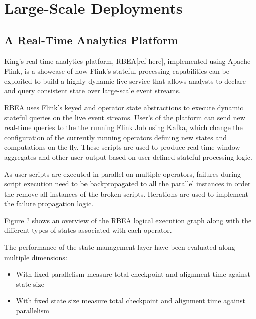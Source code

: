 
\section{Large-Scale Deployments}
\label{sec:evaluation}

\subsection{A Real-Time Analytics Platform}

King's real-time analytics platform, RBEA[ref here], implemented using Apache Flink, is a showcase of how Flink's stateful processing capabilities can be exploited to build a highly dynamic live service that allows analysts to declare and query consistent state over large-scale event streams. 

RBEA uses Flink's keyed and operator state abstractions to execute dynamic stateful queries on the live event streams. User's of the platform can send new real-time queries to the the running Flink Job using Kafka, which change the configuration of the currently running operators defining new states and computations on the fly. These scripts are used to produce real-time window aggregates and other user output based on user-defined stateful processing logic. 

As user scripts are executed in parallel on multiple operators, failures during script execution need to be backpropagated to all the parallel instances in order the remove all instances of the broken scripts. Iterations are used to implement the failure propagation logic.

Figure ? shows an overview of the RBEA logical execution graph along with the different types of states associated with each operator.

The performance of the state management layer have been evaluated along multiple dimensions:
\begin{itemize}
    \item With fixed parallelism measure total checkpoint and alignment time against state size
    \item With fixed state size measure total checkpoint and alignment time against parallelism
\end{itemize}



